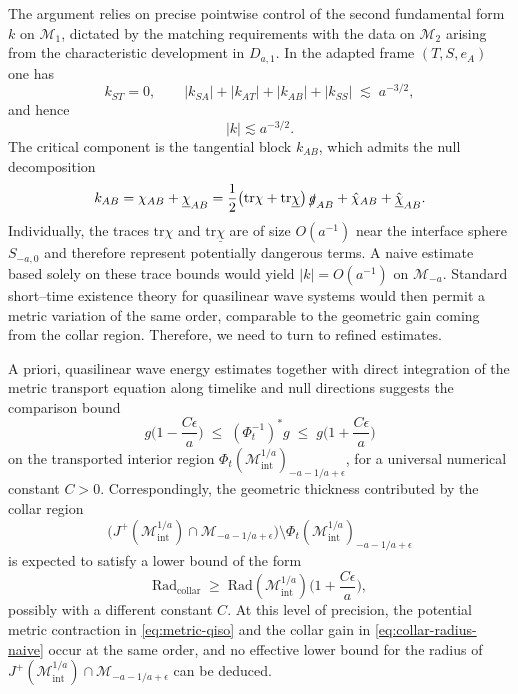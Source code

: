 \documentclass{amsart}
\newcommand{\gslash}{\slashed{g}}
\newcommand{\tr}{\mbox{tr}}
\begin{document}
\noindent The argument relies on precise pointwise control of the second fundamental form $k$ on
$\mathcal M_{1}$, dictated by the matching requirements with the data on $\mathcal M_{2}$
arising from the characteristic development in $D_{a,1}$. In the adapted frame
$(T,S,e_A)$ one has
\[
k_{ST}=0,
\qquad
|k_{SA}|+|k_{AT}|+|k_{AB}|+|k_{SS}|
\;\lesssim\; a^{-3/2},
\]
and hence
\[
|k|\lesssim a^{-3/2}.
\]
The critical component is the tangential block $k_{AB}$, which admits the null
decomposition
\[
k_{AB}
=
\chi_{AB}+\underline\chi_{AB}
=
\frac12\big(\tr\chi+\tr\underline\chi\big)\,\gslash_{AB}
+\hat\chi_{AB}+\hat{\underline\chi}_{AB}.
\]
Individually, the traces $\tr\chi$ and $\tr\underline\chi$ are of size $O(a^{-1})$ near
the interface sphere $S_{-a,0}$ and therefore represent potentially dangerous terms.
A naive estimate based solely on these trace bounds would yield $|k|=O(a^{-1})$ on
$\mathcal M_{-a}$. Standard short–time existence theory for quasilinear wave systems
would then permit a metric variation of the same order, comparable to the geometric gain
coming from the collar region. Therefore, we need to turn to refined estimates.

 
\noindent A priori, quasilinear wave energy estimates together with direct integration of the
metric transport equation along timelike and null directions suggests the comparison bound
\begin{equation}
\label{eq:metric-qiso}
g\Big(1-\frac{C\epsilon}{a}\Big)
\;\le\;
(\Phi_t^{-1})^{*}g
\;\le\;
g\Big(1+\frac{C\epsilon}{a}\Big)
\end{equation}
on the transported interior region
$\Phi_t(\mathcal M^{1/a}_{\mathrm{int}})_{-a-1/a+\epsilon}$, for a universal numerical
constant $C>0$. Correspondingly, the geometric thickness contributed by the collar region
\[
\Big(J^{+}(\mathcal M^{1/a}_{\mathrm{int}})\cap \mathcal M_{-a-1/a+\epsilon}\Big)
\setminus
\Phi_t(\mathcal M^{1/a}_{\mathrm{int}})_{-a-1/a+\epsilon}
\]
is expected to satisfy a lower bound of the form
\begin{equation}
\label{eq:collar-radius-naive}
\text{Rad}_{\mathrm{collar}}
\;\ge\;
\text{Rad}(\mathcal M^{1/a}_{\mathrm{int}})
\Big(1+\frac{C\epsilon}{a}\Big),
\end{equation}
possibly with a different constant $C$. At this level of precision, the potential metric
contraction in \eqref{eq:metric-qiso} and the collar gain in
\eqref{eq:collar-radius-naive} occur at the same order, and no effective lower bound for
the radius of
$J^{+}(\mathcal M^{1/a}_{\mathrm{int}})\cap \mathcal M_{-a-1/a+\epsilon}$
can be deduced.
\end{document}
